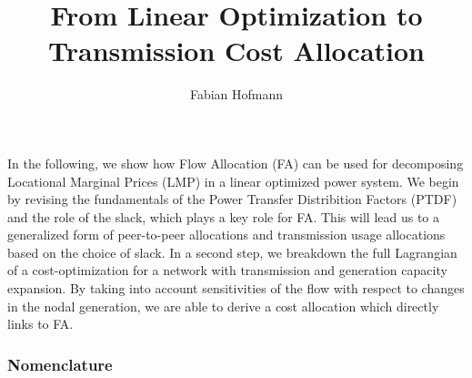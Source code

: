 \documentclass[11pt]{article}
\begin{document}
\title{From Linear Optimization to Transmission Cost Allocation}
\author{Fabian Hofmann}

\maketitle


In the following, we show how Flow Allocation (FA) can be used for decomposing Locational Marginal Prices (LMP) in a linear optimized power system. We begin by revising the fundamentals of the Power Transfer Distribition Factors (PTDF) and the role of the slack, which plays a key role for FA. This will lead us to a generalized form of peer-to-peer allocations and transmission usage allocations based on the choice of slack. In a second step, we breakdown the full Lagrangian of a cost-optimization for a network with transmission and generation capacity expansion. By taking into account sensitivities of the flow with respect to changes in the nodal generation, we are able to derive a cost allocation which directly links to FA.  

\subsubsection*{Nomenclature}
\end{document}
